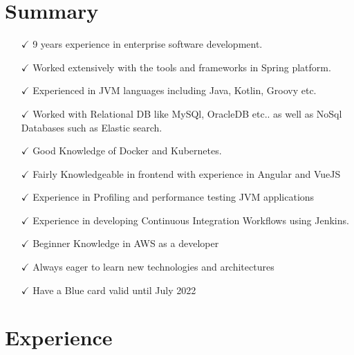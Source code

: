 \documentclass[letterpaper]{twentysecondcv} %
\begin{document}
\section{Summary}
\begin{itemize}[leftmargin=*]
	\item[$\checkmark$] 9 years experience in enterprise software development.
	\item[$\checkmark$] Worked extensively with the tools and frameworks in Spring platform.
	\item[$\checkmark$] Experienced in JVM languages including Java, Kotlin, Groovy etc.
	\item[$\checkmark$] Worked with Relational DB like MySQl, OracleDB etc.. as well as NoSql Databases such as Elastic search.
	\item[$\checkmark$] Good Knowledge of Docker and Kubernetes.
	\item[$\checkmark$] Fairly Knowledgeable in frontend with experience in Angular and VueJS
	\item[$\checkmark$] Experience in Profiling and performance testing JVM applications
	\item[$\checkmark$] Experience in developing Continuous Integration Workflows using Jenkins.
	\item[$\checkmark$] Beginner Knowledge in AWS as a developer
	\item[$\checkmark$] Always eager to learn new technologies and architectures
	\item[$\checkmark$] Have a Blue card valid until July 2022
\end{itemize}

\vspace{10 pt}

\section{Experience} 
 
\end{document}
